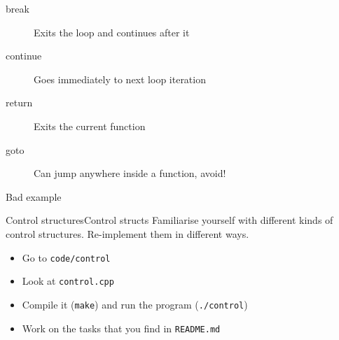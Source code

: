 \begin{frame}[fragile]
  \begin{block}{}
    \begin{description}
    \item[break] Exits the loop and continues after it
    \item[continue] Goes immediately to next loop iteration
    \item[return] Exits the current function
    \item[goto] Can jump anywhere inside a function, avoid!
    \end{description}
  \end{block}
  \pause
  \begin{alertblock}{Bad example}
  \end{alertblock}
\end{frame}

\begin{frame}[fragile]
  \begin{exerciseWithShortcut}{Control structures}{Control structs}
    Familiarise yourself with different kinds of control structures. Re-implement them in different ways.
    \begin{itemize}
      \item Go to \texttt{code/control}
      \item Look at \texttt{control.cpp}
      \item Compile it (\texttt{make}) and run the program (\texttt{./control})
      \item Work on the tasks that you find in \texttt{README.md}
    \end{itemize}
  \end{exerciseWithShortcut}
\end{frame}
